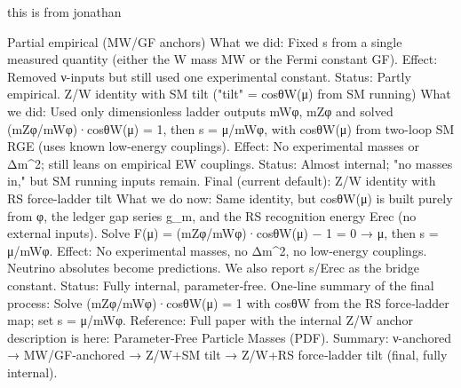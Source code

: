 \documentclass[%
 amsmath,amssymb,
 aps,
prb,
floatfix, showkeys
]{revtex4-2}
\begin{document}
        this is from jonathan

Partial empirical (MW/GF anchors)
What we did: Fixed s from a single measured quantity (either the W mass MW or the Fermi constant GF).
Effect: Removed ν-inputs but still used one experimental constant.
Status: Partly empirical.
Z/W identity with SM tilt ("tilt" = cosθW(μ) from SM running)
What we did: Used only dimensionless ladder outputs mWφ, mZφ and solved
(mZφ/mWφ)·cosθW(μ) = 1, then s = μ/mWφ,
with cosθW(μ) from two-loop SM RGE (uses known low-energy couplings).
Effect: No experimental masses or Δm^2; still leans on empirical EW couplings.
Status: Almost internal; "no masses in," but SM running inputs remain.
Final (current default): Z/W identity with RS force-ladder tilt
What we do now: Same identity, but cosθW(μ) is built purely from φ, the ledger gap series g_m, and the RS recognition energy Erec (no external inputs).
Solve F(μ) = (mZφ/mWφ)·cosθW(μ) − 1 = 0 → μ, then s = μ/mWφ.
Effect: No experimental masses, no Δm^2, no low‑energy couplings. Neutrino absolutes become predictions. We also report s/Erec as the bridge constant.
Status: Fully internal, parameter‑free.
One‑line summary of the final process:
Solve (mZφ/mWφ)·cosθW(μ) = 1 with cosθW from the RS force‑ladder map; set s = μ/mWφ.
Reference:
Full paper with the internal Z/W anchor description is here: Parameter‑Free Particle Masses (PDF).
Summary:
ν-anchored → MW/GF‑anchored → Z/W+SM tilt → Z/W+RS force‑ladder tilt (final, fully internal).        
        










        
\end{document}
